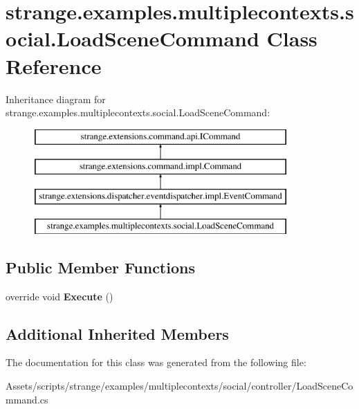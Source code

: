 \hypertarget{classstrange_1_1examples_1_1multiplecontexts_1_1social_1_1_load_scene_command}{\section{strange.\-examples.\-multiplecontexts.\-social.\-Load\-Scene\-Command Class Reference}
\label{classstrange_1_1examples_1_1multiplecontexts_1_1social_1_1_load_scene_command}
}
Inheritance diagram for strange.\-examples.\-multiplecontexts.\-social.\-Load\-Scene\-Command\-:\begin{figure}[H]
\begin{center}
\leavevmode
\includegraphics[height=4.000000cm]{classstrange_1_1examples_1_1multiplecontexts_1_1social_1_1_load_scene_command}
\end{center}
\end{figure}
\subsection*{Public Member Functions}
\begin{DoxyCompactItemize}
\item 
\hypertarget{classstrange_1_1examples_1_1multiplecontexts_1_1social_1_1_load_scene_command_aee4a2a69f64d7e4964e9f6c2bce66d83}{override void {\bfseries Execute} ()}\label{classstrange_1_1examples_1_1multiplecontexts_1_1social_1_1_load_scene_command_aee4a2a69f64d7e4964e9f6c2bce66d83}

\end{DoxyCompactItemize}
\subsection*{Additional Inherited Members}


The documentation for this class was generated from the following file\-:\begin{DoxyCompactItemize}
\item 
Assets/scripts/strange/examples/multiplecontexts/social/controller/Load\-Scene\-Command.\-cs\end{DoxyCompactItemize}
